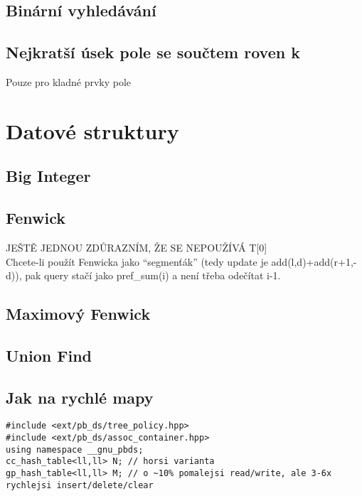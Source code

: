\documentclass[10pt, a4paper]{article}
\begin{document}
\subsection{Binární vyhledávání}


\subsection{Nejkratší úsek pole se součtem roven k}
Pouze pro kladné prvky pole


\newpage

\section{Datové struktury}

\subsection{Big Integer}


\subsection{Fenwick}
JEŠTĚ JEDNOU ZDŮRAZNÍM, ŽE SE NEPOUŽÍVÁ T[0]\\
Chcete-li použít Fenwicka jako ``segmenťák'' (tedy update je add(l,d)+add(r+1,-d)), pak query stačí jako pref\_sum(i) a není třeba odečítat i-1.


\subsection{Maximový Fenwick}


\subsection{Union Find}


\subsection{Jak na rychlé mapy}
\begin{lstlisting}
#include <ext/pb_ds/tree_policy.hpp>
#include <ext/pb_ds/assoc_container.hpp>
using namespace __gnu_pbds;
cc_hash_table<ll,ll> N; // horsi varianta
gp_hash_table<ll,ll> M; // o ~10% pomalejsi read/write, ale 3-6x rychlejsi insert/delete/clear
\end{lstlisting}
\end{document}
